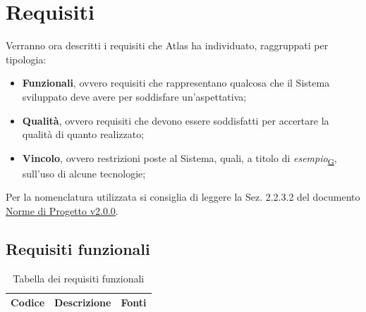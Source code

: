 ﻿\documentclass[a4paper,12pt]{article}
\begin{document}
\section{Requisiti}{
Verranno ora descritti i requisiti che Atlas ha individuato, raggruppati per tipologia:
\begin{itemize}
    \item \textbf{Funzionali}, ovvero requisiti che rappresentano qualcosa che il Sistema sviluppato deve avere per soddisfare un'aspettativa;
    \item \textbf{Qualità}, ovvero requisiti che devono essere soddisfatti per accertare la qualità di quanto realizzato;
    \item \textbf{Vincolo}, ovvero restrizioni poste al Sistema, quali, a titolo di \textit{esempio}\textsubscript{\href{https://atlasteam9.github.io/Atlas/glossario.html\#Esempio}{G}}, sull'uso di alcune tecnologie;
\end{itemize}

\noindent Per la nomenclatura utilizzata si consiglia di leggere la Sez. 2.2.3.2 del documento \href{https://atlasteam9.github.io/Atlas/docs/PB/documenti/interni/Norme%20di%20Progetto.pdf}{Norme di Progetto v2.0.0}.

    \subsection{Requisiti funzionali}{

        \setlength{\LTleft}{\fill}
        \setlength{\LTright}{\fill}
    
        \begin{longtable}{|l|p{}|p{}|}
            \caption{Tabella dei requisiti funzionali}
            \label{tab:requisiti-funzionali}                                                                                                                                                                                                                                                       \\
            \hline
            \rowcolor{gold}
            \textbf{Codice} & \textbf{Descrizione}                                                                                                                                                                        & \textbf{Fonti}                                                         \\
            \hline
            \endfirsthead


\end{longtable}}}
\end{document}
